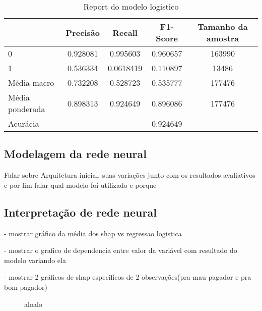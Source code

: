 \begin{table}[H]
\centering
\begin{tabular}{lcccc}
  \hline
                &    \textbf{Precisão} & \textbf{Recall}    &   \textbf{F1-Score} &  \textbf{Tamanho da amostra} \\
  \hline
   0            &    0.928081 & 0.995603  &   0.960657 & 163990        \\
   1            &    0.536334 & 0.0618419 &   0.110897 & 13486        \\
   Média macro    &    0.732208 & 0.528723  &   0.535777 & 177476        \\
   Média ponderada &    0.898313 & 0.924649  &   0.896086 & 177476        \\
   \hline
   Acurácia     &             &           &   0.924649 &  \\

  \hline
\end{tabular}
\label{tab:report_logist_model}
\caption{Report do modelo logístico}
\end{table}



\subsection*{Modelagem da rede neural}
Falar sobre Arquitetura inicial, suas variações junto com os 
resultados avaliativos e por fim falar qual modelo foi utilizado
e porque

\subsection*{Interpretação de rede neural}

- mostrar gráfico da média dos shap vs regressao logistica

- mostrar o grafico de dependencia entre valor da variável com resultado do modelo variando ela

- mostrar 2 gráficos de shap especificos de 2 observações(pra mau pagador e pra bom pagador)
\begin{figure}[H]
  \centering
  \vspace{.5cm}
  \vspace{.5cm}
  
  \label{fig:enter-label}
  \caption{aloalo}
\end{figure}

